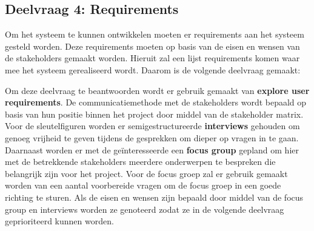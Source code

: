 \subsection{Deelvraag 4: Requirements}
Om het systeem te kunnen ontwikkelen moeten er requirements aan het systeem gesteld worden.
Deze requirements moeten op basis van de eisen en wensen van de stakeholders gemaakt worden.
Hieruit zal een lijst requirements komen waar mee het systeem gerealiseerd wordt.
Daarom is de volgende deelvraag gemaakt:

\begin{center}
 \textit{\SubquestionFour}
\end{center}

\whitespace[0.2]
Om deze deelvraag te beantwoorden wordt er gebruik gemaakt van \textbf{explore user requirements}.
De communicatiemethode met de stakeholders wordt bepaald op basis van hun positie binnen het project door middel van de stakeholder matrix.
Voor de sleutelfiguren worden er semigestructureerde \textbf{interviews} gehouden om genoeg vrijheid te geven tijdens de gesprekken om dieper op vragen in te gaan.
Daarnaast worden er met de geïnteresseerde een \textbf{focus group} gepland om hier met de betrekkende stakeholders meerdere onderwerpen te bespreken die belangrijk zijn voor het project.
Voor de focus groep zal er gebruik gemaakt worden van een aantal voorbereide vragen om de focus groep in een goede richting te sturen.
Als de eisen en wensen zijn bepaald door middel van de focus group en interviews worden ze genoteerd zodat ze in de volgende deelvraag geprioriteerd kunnen worden.
